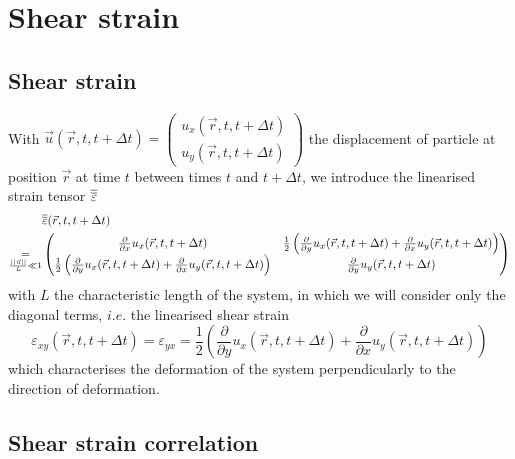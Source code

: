 \documentclass[class=report, float=false, crop=false]{standalone}
\begin{document}
\section{Shear strain}

\subsection{Shear strain}
\label{subsection:shear_strain}

With $\vec{u}(\vec{r}, t, t + \Delta t) = \begin{pmatrix} u_x(\vec{r}, t, t + \Delta t) \\ u_y(\vec{r}, t, t + \Delta t) \end{pmatrix}$ the displacement of particle at position $\vec{r}$ at time $t$ between times $t$ and $t + \Delta t$, we introduce the linearised strain tensor $\overline{\overline{\varepsilon}}$ \cite{landau1986theory}
\begin{equation}
\begin{aligned}
&\overline{\overline{\varepsilon}}(\vec{r}, t, t + \Delta t)\\
\underset{\frac{||\vec{u}||}{L} \ll 1}{=} &\begin{pmatrix} \frac{\partial}{\partial x} u_x(\vec{r}, t, t + \Delta t) & \frac{1}{2} \left(\frac{\partial}{\partial y} u_x(\vec{r}, t, t + \Delta t) + \frac{\partial}{\partial x} u_y(\vec{r}, t, t + \Delta t)\right) \\ \frac{1}{2} \left(\frac{\partial}{\partial y} u_x(\vec{r}, t, t + \Delta t) + \frac{\partial}{\partial x} u_y(\vec{r}, t, t + \Delta t)\right) &  \frac{\partial}{\partial y} u_y(\vec{r}, t, t + \Delta t) \end{pmatrix}
\end{aligned}
\end{equation}
with $L$ the characteristic length of the system, in which we will consider only the diagonal terms, $\textit{i.e.}$ the linearised shear strain
\begin{equation}
\varepsilon_{xy}(\vec{r}, t, t + \Delta t) = \varepsilon_{yx} = \frac{1}{2} \left(\frac{\partial}{\partial y} u_x(\vec{r}, t, t + \Delta t) + \frac{\partial}{\partial x} u_y(\vec{r}, t, t + \Delta t)\right)
\label{linearised_shear_strain}
\end{equation}
which characterises the deformation of the system perpendicularly to the direction of deformation.

\subsection{Shear strain correlation}
\label{subsection:shear_strain_correlation}
\end{document}
